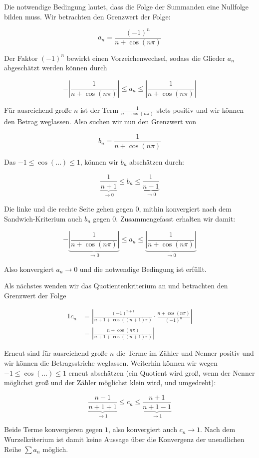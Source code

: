 \item Die notwendige Bedingung lautet, dass die Folge der Summanden eine Nullfolge bilden muss. Wir betrachten den Grenzwert der Folge:

$$
	a_n = \frac{(-1)^n}{n+\cos(n\pi)}
$$

Der Faktor $(-1)^n$ bewirkt einen Vorzeichenwechsel, sodass die Glieder $a_n$  abgeschätzt werden können durch

$$
 -\left|\frac{1}{n+\cos(n\pi)}\right| \le a_n \le \left|\frac{1}{n+\cos(n\pi)}\right|
$$

Für ausreichend große $n$ ist der Term $\frac{1}{n+\cos(n\pi)}$ stets positiv und wir können den Betrag weglassen. Also suchen wir nun den Grenzwert von

$$
 b_n = \frac{1}{n+\cos(n\pi)}
$$

Das $-1 \le \cos(\dots) \le 1$, können wir $b_n$ abschätzen durch:

$$
	\underbrace{\frac{1}{n+1}}_{\to 0} \le b_n \le \underbrace{\frac{1}{n-1}}_{\to 0}
$$

Die linke und die rechte Seite gehen gegen $0$, mithin konvergiert nach dem Sandwich-Kriterium auch $b_n$ gegen $0$. Zusammengefasst erhalten wir damit:

$$
-\underbrace{\left|\frac{1}{n+\cos(n\pi)}\right|}_{\to 0} \le a_n \le \underbrace{\left|\frac{1}{n+\cos(n\pi)}\right|}_{\to 0}
$$

Also konvergiert $a_n \to 0$ und die notwendige Bedingung ist erfüllt.

Als nächstes wenden wir das Quotientenkriterium an und betrachten den Grenzwert der Folge

\begin{alignat*}{1}
	c_n &= \left| \frac{(-1)^{n+1}}{n+1+\cos((n+1)\pi)} \cdot \frac{n+\cos(n\pi)}{(-1)^n} \right| \\
	    &= \left| \frac{n+\cos(n\pi)}{n+1+\cos((n+1)\pi)} \right|
\end{alignat*}

Erneut sind für ausreichend große $n$ die Terme im Zähler und Nenner positiv und wir können die Betragsstriche weglassen. Weiterhin können wir wegen $-1 \le \cos(\dots) \le 1$ erneut abschätzen (ein Quotient wird groß, wenn der Nenner möglichst groß und der Zähler möglichst klein wird, und umgedreht):

$$
 \underbrace{\frac{n-1}{n+1+1}}_{\to 1}	\le c_n \le \underbrace{\frac{n+1}{n+1-1}}_{\to 1}
$$

Beide Terme konvergieren gegen $1$, also konvergiert auch $c_n \to 1$. Nach dem Wurzelkriterium ist damit keine Aussage über die Konvergenz der unendlichen Reihe $\sum\limits a_n$ möglich.
